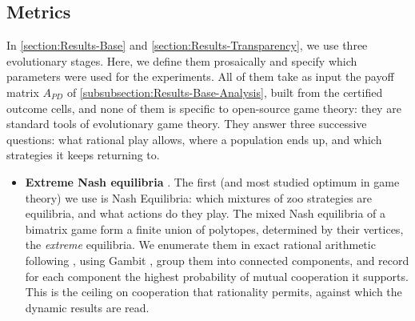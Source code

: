 \documentclass[twoside,11pt]{article}
\begin{document}
\subsection{Metrics}
\label{apx-subsection:Experiments-EGTMetrics}
In \cref{section:Results-Base} and \cref{section:Results-Transparency}, we use three evolutionary stages. Here, we define them prosaically and specify which parameters were used for the experiments. All of them take as input the payoff matrix $A_{PD}$ of \cref{subsubsection:Results-Base-Analysis}, built from the certified outcome cells, and none of them is specific to open-source game theory: they are standard tools of evolutionary game theory. They answer three successive questions: what rational play allows, where a population ends up, and which strategies it keeps returning to.
\begin{itemize}
    \item \textbf{Extreme Nash equilibria} \citep{nash1950equilibrium,nash1951}. The first (and most studied optimum in game theory) we use is Nash Equilibria: which mixtures of zoo strategies are equilibria, and what actions do they play. The mixed Nash equilibria of a bimatrix game form a finite union of polytopes, determined by their vertices, the \emph{extreme} equilibria. We enumerate them in exact rational arithmetic following \citet{enumerateNE}, using Gambit \citep{gambit}, group them into connected components, and record for each component the highest probability of mutual cooperation it supports. This is the ceiling on cooperation that rationality permits, against which the dynamic results are read.

\end{itemize}
\end{document}
